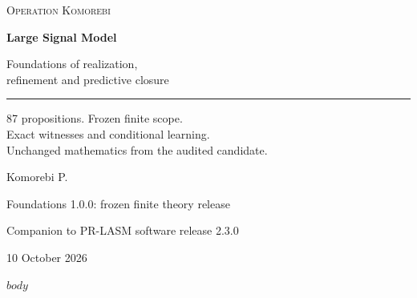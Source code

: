 \documentclass[11pt,letterpaper]{article}
\begin{document}
\hypersetup{pageanchor=false}
\begin{titlepage}
\vspace*{0.5in}
{\small\textsc{Operation Komorebi}\par}
\vspace{0.72in}
{\fontsize{33}{39}\selectfont\bfseries Large Signal Model\par}
\vspace{0.3in}
{\fontsize{21}{27}\selectfont Foundations of realization,\\refinement and predictive closure\par}
\vspace{0.45in}
\rule{\textwidth}{0.45pt}\par
\vspace{0.3in}
\begin{minipage}{0.95\textwidth}
\large
87 propositions. Frozen finite scope.\\Exact witnesses and conditional learning.\\Unchanged mathematics from the audited candidate.
\end{minipage}
\vfill
{\Large Komorebi P.\par}
\vspace{0.2in}
{\normalsize Foundations 1.0.0: frozen finite theory release\par}
{\normalsize Companion to PR-LASM software release 2.3.0\par}
{\normalsize 10 October 2026\par}
\end{titlepage}
\hypersetup{pageanchor=true}
$body$
\end{document}
